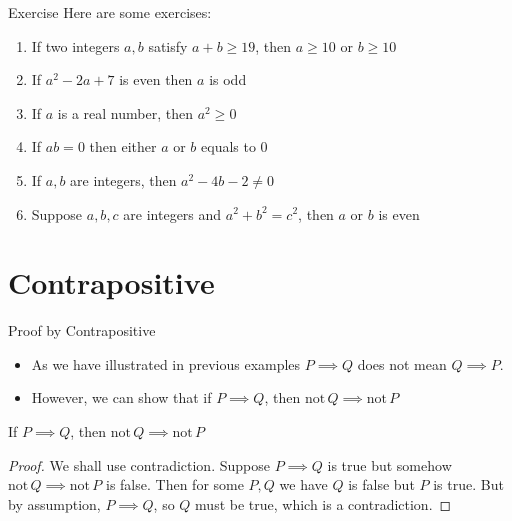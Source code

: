 \documentclass[10pt,xcolor={table,dvipsnames},t]{beamer}
\begin{document}
\begin{frame}{Exercise}
  Here are some exercises:
  \begin{enumerate}
    \item If two integers $a,b$ satisfy $a+b\geq 19$, then $a\geq 10$ or $b\geq 10$
    \item If $a^2-2a+7$ is even then $a$ is odd
    \item If $a$ is a real number, then $a^2 \geq 0$
    \item If $ab=0$ then either $a$ or $b$ equals to 0
    \item If $a,b$ are integers, then $a^2-4b-2\neq 0$
    \item Suppose $a,b,c$ are integers and $a^2 + b^2 = c^2$, then $a$ or $b$ is even
  \end{enumerate}
\end{frame}

\section{Contrapositive}
\begin{frame}{Proof by Contrapositive}
  \begin{itemize}
    \item As we have illustrated in previous examples $P \implies Q$ does not mean $Q\implies P$.
    \item However, we can show that if $P \implies Q$, then $\text{not}\,Q \implies \text{not}\,P$
  \end{itemize}
  \begin{theorem}[Contrapositive]
    If $P \implies Q$, then $\text{not}\,Q \implies \text{not}\,P$
    \begin{proof}
      We shall use contradiction. Suppose $P \implies Q$ is true but somehow  $\text{not}\,Q \implies \text{not}\,P$ is false. Then for some $P,Q$ we have $Q$ is false but $P$ is true. But by assumption, $P\implies Q$, so $Q$ must be true, which is a contradiction.
    \end{proof}
  \end{theorem}
\end{frame}
\end{document}
